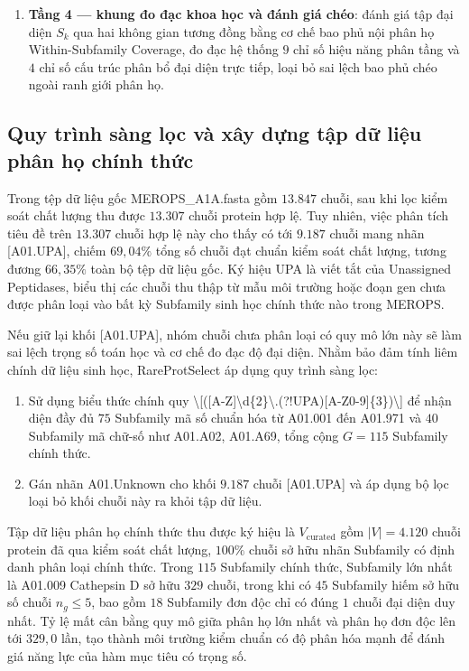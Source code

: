 \begin{enumerate}
    \item \textbf{Tầng 4 --- khung đo đạc khoa học và đánh giá chéo}: đánh giá tập đại diện $S_k$ qua hai không gian tương đồng bằng cơ chế bao phủ nội phân họ Within-Subfamily Coverage, đo đạc hệ thống $9$ chỉ số hiệu năng phân tầng và $4$ chỉ số cấu trúc phân bổ đại diện trực tiếp, loại bỏ sai lệch bao phủ chéo ngoài ranh giới phân họ.
\end{enumerate}

\subsection{Quy trình sàng lọc và xây dựng tập dữ liệu phân họ chính thức}
\label{subsec:methodology_curation}

Trong tệp dữ liệu gốc MEROPS\_A1A.fasta gồm $13.847$ chuỗi, sau khi lọc kiểm soát chất lượng thu được $13.307$ chuỗi protein hợp lệ. Tuy nhiên, việc phân tích tiêu đề trên $13.307$ chuỗi hợp lệ này cho thấy có tới $9.187$ chuỗi mang nhãn [A01.UPA], chiếm $69{,}04\%$ tổng số chuỗi đạt chuẩn kiểm soát chất lượng, tương đương $66{,}35\%$ toàn bộ tệp dữ liệu gốc. Ký hiệu UPA là viết tắt của Unassigned Peptidases, biểu thị các chuỗi thu thập từ mẫu môi trường hoặc đoạn gen chưa được phân loại vào bất kỳ Subfamily sinh học chính thức nào trong MEROPS.

Nếu giữ lại khối [A01.UPA], nhóm chuỗi chưa phân loại có quy mô lớn này sẽ làm sai lệch trọng số toán học và cơ chế đo đạc độ đại diện. Nhằm bảo đảm tính liêm chính dữ liệu sinh học, RareProtSelect áp dụng quy trình sàng lọc:
\begin{enumerate}
    \item Sử dụng biểu thức chính quy \textbackslash [([A-Z]\textbackslash d\{2\}\textbackslash .(?!UPA)[A-Z0-9]\{3\})\textbackslash ] để nhận diện đầy đủ $75$ Subfamily mã số chuẩn hóa từ A01.001 đến A01.971 và $40$ Subfamily mã chữ-số như A01.A02, A01.A69, tổng cộng $G = 115$ Subfamily chính thức.
    \item Gán nhãn A01.Unknown cho khối $9.187$ chuỗi [A01.UPA] và áp dụng bộ lọc loại bỏ khối chuỗi này ra khỏi tập dữ liệu.
\end{enumerate}

Tập dữ liệu phân họ chính thức thu được ký hiệu là $V_{\text{curated}}$ gồm $|V| = 4.120$ chuỗi protein đã qua kiểm soát chất lượng, $100\%$ chuỗi sở hữu nhãn Subfamily có định danh phân loại chính thức. Trong $115$ Subfamily chính thức, Subfamily lớn nhất là A01.009 Cathepsin D sở hữu $329$ chuỗi, trong khi có $45$ Subfamily hiếm sở hữu số chuỗi $n_g \le 5$, bao gồm $18$ Subfamily đơn độc chỉ có đúng $1$ chuỗi đại diện duy nhất. Tỷ lệ mất cân bằng quy mô giữa phân họ lớn nhất và phân họ đơn độc lên tới $329{,}0$ lần, tạo thành môi trường kiểm chuẩn có độ phân hóa mạnh để đánh giá năng lực của hàm mục tiêu có trọng số.

